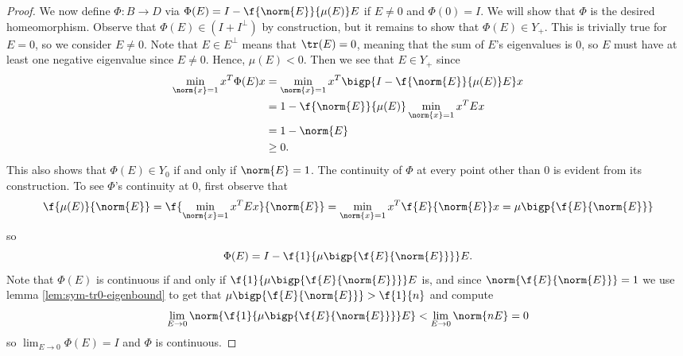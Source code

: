 \begin{proposition}
\begin{proof}
        We now define $\Phi : B \to D$ via $\Phi(E) =  I - \f{\norm{E}}{\mu(E)}E$ if $E \neq 0$ and $\Phi(0) = I$.
        We will show that $\Phi$ is the desired homeomorphism.
        Observe that $\Phi(E) \in (I + I^\perp)$ by construction, but it remains to show that $\Phi(E) \in Y_+$.
        This is trivially true for $E = 0$, so we consider $E \neq 0$.
        Note that $E \in E^\perp$ means that $\tr(E) = 0$, meaning that the sum of $E$'s eigenvalues is $0$, so $E$ must have at least one negative eigenvalue since $E \neq 0$.
        Hence, $\mu(E) < 0$.
        Then we see that $E \in Y_+$ since
        \begin{align*}
            \min_{\norm{x} = 1} x^T \Phi(E) x
            &= \min_{\norm{x} = 1} x^T \bigp{I - \f{\norm{E}}{\mu(E)}E} x \\
            &= 1  - \f{\norm{E}}{\mu(E)} \min_{\norm{x} = 1} x^T E x \\
            &= 1 - \norm{E} \\
            &\geq 0.
        \end{align*}
        This also shows that $\Phi(E) \in Y_0$ if and only if $\norm{E} = 1$.
        The continuity of $\Phi$ at every point other than $0$ is evident from its construction.
        To see $\Phi$'s continuity at $0$, first observe that
        \[
            \f{\mu(E)}{\norm{E}}
            = \f{\min_{\norm{x} = 1} x^T E x}{\norm{E}}
            = \min_{\norm{x} = 1} x^T \f{E}{\norm{E}} x
            = \mu\bigp{\f{E}{\norm{E}}}
        \]
        so
        \[
            \Phi(E) = I - \f{1}{\mu\bigp{\f{E}{\norm{E}}}} E.
        \]
        Note that $\Phi(E)$ is continuous if and only if $\f{1}{\mu\bigp{\f{E}{\norm{E}}}} E$ is, and since $\norm{\f{E}{\norm{E}}} = 1$ we use lemma \ref{lem:sym-tr0-eigenbound} to get that $\mu\bigp{\f{E}{\norm{E}}} > \f{1}{n}$ and  compute
        \[
            \lim_{E \to 0} \norm{\f{1}{\mu\bigp{\f{E}{\norm{E}}}} E}
            < \lim_{E \to 0} \norm{n E}
            = 0
        \]
        so $\lim_{E \to 0} \Phi(E) = I$ and $\Phi$ is continuous.
        

\end{proof}
\end{proposition}
